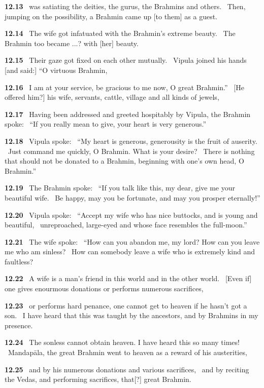 \documentclass{article}
\begin{document}
\textbf{12.13}%
\ was satiating the deities, the gurus, the Brahmins and others.%
\ Then, jumping on the possibility, a Brahmin came up [to them] as a guest.%


\textbf{12.14}%
\ The wife got infatuated with the Brahmin's extreme beauty.%
\ The Brahmin too became ...? with [her] beauty.%


\textbf{12.15}%
\ Their gaze got fixed on each other mutually.%
\ Vipula joined his hands [and said:] ``O virtuous Brahmin,%


\textbf{12.16}%
\ I am at your service, be gracious to me now, O great Brahmin.''%
\ [He offered him?] his wife, servants, cattle, village and all kinds of jewels,%


\textbf{12.17}%
\ Having been addressed and greeted hospitably by Vipula, the Brahmin spoke:%
\ ``If you really mean to give, your heart is very generous.''%


\textbf{12.18}%
\ Vipula spoke:%
\ ``My heart is generous, generousity is the fruit of auserity.%
\ Just command me quickly, O Brahmin. What is your desire?%
\ There is nothing that should not be donated to a Brahmin, beginning with one's own head, O Brahmin.''%


\textbf{12.19}%
\ The Brahmin spoke:%
\ ``If you talk like this, my dear, give me your beautiful wife.%
\ Be happy, may you be fortunate, and may you prosper eternally!''%


\textbf{12.20}%
\ Vipula spoke:%
\ ``Accept my wife who has nice buttocks, and is young and beautiful,%
\ unreproached, large-eyed and whose face resembles the full-moon.''%


\textbf{12.21}%
\ The wife spoke:%
\ ``How can you abandon me, my lord? How can you leave me who am sinless?%
\ How can somebody leave a wife who is extremely kind and faultless?%


\textbf{12.22}%
\ A wife is a man's friend in this world and in the other world.%
\ [Even if] one gives enourmous donations or performs numerous sacrifices,%


\textbf{12.23}%
\ or performs hard penance, one cannot get to heaven if he hasn't got a son.%
\ I have heard that this was taught by the ancestors, and by Brahmins in my presence.%


\textbf{12.24}%
\ The sonless cannot obtain heaven. I have heard this so many times!%
\ Mandapāla, the great Brahmin went to heaven as a reward of his austerities,%


\textbf{12.25}%
\ and by his numerous donations and various sacrifices,%
\ and by reciting the Vedas, and performing sacrifices, that[?] great Brahmin.%
\end{document}
